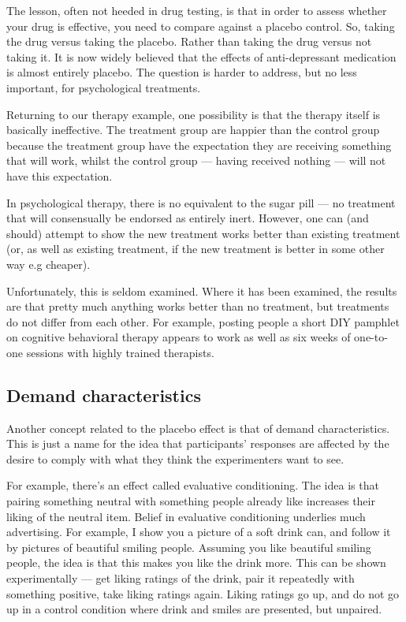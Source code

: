 \documentclass[12pt]{article}
\begin{document}
The lesson, often not heeded in drug testing, is that in order to
assess whether your drug is effective, you need to compare against a
placebo control. So, taking the drug versus taking the placebo. Rather
than taking the drug versus not taking it. It is now widely believed
that the effects of anti-depressant medication is almost entirely
placebo. The question is harder to address, but no less important, for
psychological treatments.

Returning to our therapy example, one possibility is that the therapy
itself is basically ineffective. The treatment group are happier than
the control group because the treatment group have the expectation
they are receiving something that will work, whilst the control group
--- having received nothing --- will not have this expectation.

In psychological therapy, there is no equivalent to the sugar pill ---
no treatment that will consensually be endorsed as entirely
inert. However, one can (and should) attempt to show the new treatment
works better than existing treatment (or, as well as existing
treatment, if the new treatment is better in some other way e.g
cheaper).

Unfortunately, this is seldom examined. Where it has been examined,
the results are that pretty much anything works better than no
treatment, but treatments do not differ from each other. For example,
posting people a short DIY pamphlet on cognitive behavioral therapy
appears to work as well as six weeks of one-to-one sessions with
highly trained therapists.

\subsection{Demand characteristics}

Another concept related to the placebo effect is that of demand
characteristics. This is just a name for the idea that participants'
responses are affected by the desire to comply with what they think
the experimenters want to see.

For example, there's an effect called evaluative conditioning. The
idea is that pairing something neutral with something people already
like increases their liking of the neutral item. Belief in evaluative
conditioning underlies much advertising. For example, I show you a
picture of a soft drink can, and follow it by pictures of beautiful
smiling people. Assuming you like beautiful smiling people, the idea
is that this makes you like the drink more. This can be shown
experimentally --- get liking ratings of the drink, pair it repeatedly
with something positive, take liking ratings again. Liking ratings go
up, and do not go up in a control condition where drink and smiles are
presented, but unpaired.
\end{document}
